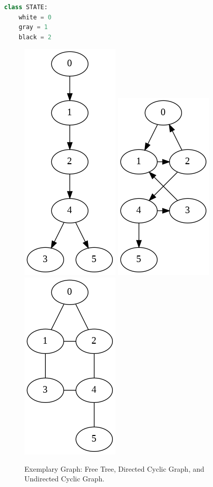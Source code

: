 \documentclass[../main.tex]{subfiles}
\begin{document}
\begin{lstlisting}[language=Python, numbers=none]
class STATE:
    white = 0
    gray = 1
    black = 2
\end{lstlisting}
\begin{figure}[!ht]
    \centering
     \includegraphics[width=0.25\columnwidth]{fig/free_tree.png}
     \includegraphics[width=0.25\columnwidth]{fig/directed_cyclic_graph.png}
      \includegraphics[width=0.25\columnwidth]{fig/undirected_cyclic_graph.png}
    \caption{Exemplary Graph: Free Tree, Directed Cyclic Graph, and Undirected Cyclic Graph.}
    \label{fig:graph_search_example}
\end{figure}
\end{document}
